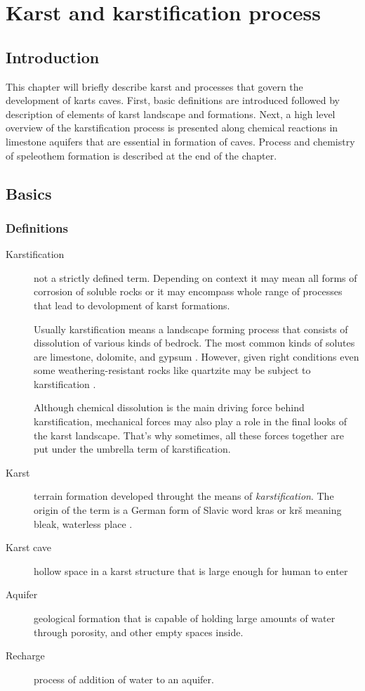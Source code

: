 \chapter{Karst and karstification process}
\section{Introduction}
This chapter will briefly describe karst and processes that govern the
development of karts caves. First, basic definitions are introduced followed by
description of elements of karst landscape and formations. Next, a high level
overview of the karstification process is presented along chemical reactions
in limestone aquifers that are essential in formation of caves. Process and
chemistry of speleothem formation is described at the end of the chapter.
\section{Basics}

\subsection{Definitions}
\begin{description}
  \item[Karstification]
    not a strictly defined term. Depending on context it may
    mean all forms of corrosion of soluble rocks or it may encompass whole range of
    processes that lead to devolopment of karst formations.
    
    Usually karstification means a landscape forming process that consists of dissolution
    of various kinds of bedrock. The most common kinds of solutes are limestone,
    dolomite, and gypsum \parencite{karstglossary}. However, given right conditions
    even some weathering-resistant rocks like quartzite may be subject to 
    karstification \parencite{migon2010}.
    
    Although chemical dissolution is the main driving force behind karstification,
    mechanical forces may also play a role in the final looks of the karst landscape.
    That's why sometimes, all these forces together are put under the umbrella term
    of karstification.

  \item[Karst]
    terrain formation developed throught the means of
    \emph{karstification}. The origin of the term is a German form of Slavic word
    kras or krš meaning bleak, waterless place \parencite{karstglossary}.
  \item[Karst cave]
    hollow space in a karst structure that is large enough for human to enter
    \parencite{hill1997cave}
  \item[Aquifer]
    geological formation that is capable of holding large amounts of water
    through porosity, and other empty spaces inside.
  \item[Recharge]
    process of addition of water to an aquifer.
\end{description}
